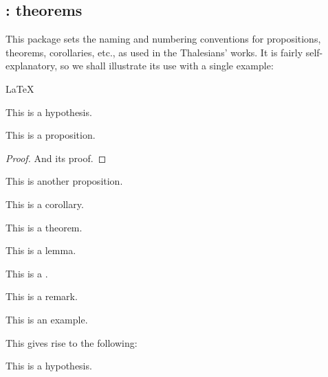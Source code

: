 \subsection{: theorems}

This package sets the naming and numbering conventions for propositions, theorems, corollaries, etc., as used in the Thalesians' works. It is fairly self-explanatory, so we shall illustrate its use with a single example:

\begin{snippet}{LaTeX}
\begin{hypothesis}
This is a hypothesis.
\end{hypothesis}

\begin{proposition}
This is a proposition.
\begin{proof}
And its proof.
\end{proof}
\end{proposition}

\begin{proposition}
This is another proposition.
\end{proposition}

\begin{corollary}
This is a corollary.
\end{corollary}

\begin{theorem}
This is a theorem.
\end{theorem}

\begin{lemma}
This is a lemma.
\end{lemma}

\begin{definition}
This is a .
\end{definition}

\begin{remark}
This is a remark.
\end{remark}

\begin{example}
This is an example.
\end{example}
\end{snippet}

This gives rise to the following:

\begin{hypothesis}
This is a hypothesis.
\end{hypothesis}

